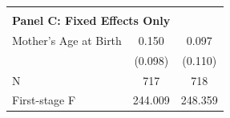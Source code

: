 \begin{table}[ht!]
{\begin{tabular}{l*{2}{c}}
                    &               &               \\
\hline \\ \multicolumn{3}{l}{\textbf{Panel C: Fixed Effects Only}} \\
Mother's Age at Birth&       0.150   &       0.097   \\
                    &     (0.098)   &     (0.110)   \\
\midrule
N                   &         717   &         718   \\
First-stage F       &     244.009   &     248.359   \\
\bottomrule \end{tabular}}\end{table}
